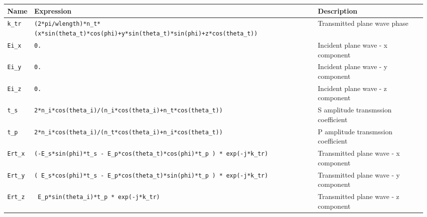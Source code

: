 \begin{sidewaystable}
\begin{tabular*}{.94\textwidth}{ |l|l|l| }
     \hline \hline
    \end{tabular*}
 \vspace*{1.5em}
 \caption{Local definitions for COMSOL simulation: Component/Definitions/Variables. The below variables are locally defined in the subvolume \lstinline!Physical transmission side!. }
 \label{tab:Transmission-parameters}
    \begin{tabular*}{.9606\textwidth}{ |l|l|l| }
     \hline
     \textbf{Name}          &   \textbf{Expression}                                                                                  &   \textbf{Description} \\ \hline \hline
     \lstinline!k_tr!        &   \lstinline!(2*pi/wlength)*n_t*(x*sin(theta_t)*cos(phi)+y*sin(theta_t)*sin(phi)+z*cos(theta_t))!      &   Transmitted plane wave phase         \\
     \lstinline!Ei_x!       &   \lstinline!0.!                                                                                       &   Incident plane wave - x component    \\
     \lstinline!Ei_y!       &   \lstinline!0.!                                                                                       &   Incident plane wave - y component    \\
     \lstinline!Ei_z!       &   \lstinline!0.!                                                                                       &   Incident plane wave - z component    \\
     \lstinline!t_s!        &   \lstinline!2*n_i*cos(theta_i)/(n_i*cos(theta_i)+n_t*cos(theta_t))!                                   &   S amplitude transmssion coefficient  \\
     \lstinline!t_p!        &   \lstinline!2*n_i*cos(theta_i)/(n_t*cos(theta_i)+n_i*cos(theta_t))!                                   &   P amplitude transmssion coefficient  \\
     \lstinline!Ert_x!      &   \lstinline!(-E_s*sin(phi)*t_s - E_p*cos(theta_t)*cos(phi)*t_p ) * exp(-j*k_tr)!                       &   Transmitted plane wave - x component \\
     \lstinline!Ert_y!      &   \lstinline!( E_s*cos(phi)*t_s - E_p*cos(theta_t)*sin(phi)*t_p ) * exp(-j*k_tr)!                       &   Transmitted plane wave - y component \\
     \lstinline!Ert_z!      &   \lstinline! E_p*sin(theta_i)*t_p * exp(-j*k_tr)!                                                      &   Transmitted plane wave - z component \\

\end{tabular*}
\end{sidewaystable}
